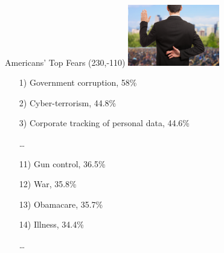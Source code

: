 \begin{frame}{Americans' Top Fears}
    \Put(230,-110){ \includegraphics[width=0.3\textwidth]{img/politician-smaller.png} }
    \begin{enumerate}
        \item[1)] Government corruption, 58\%
        \item[2)] Cyber-terrorism, 44.8\%
        \item[3)] Corporate tracking of personal data, 44.6\%
        \item[] \ldots
        \item[11)] Gun control, 36.5\%
        \item[12)] War, 35.8\%
        \item[13)] Obamacare, 35.7\%
        \item[14)] Illness, 34.4\%
        \item[] \ldots

\end{enumerate}
\end{frame}
